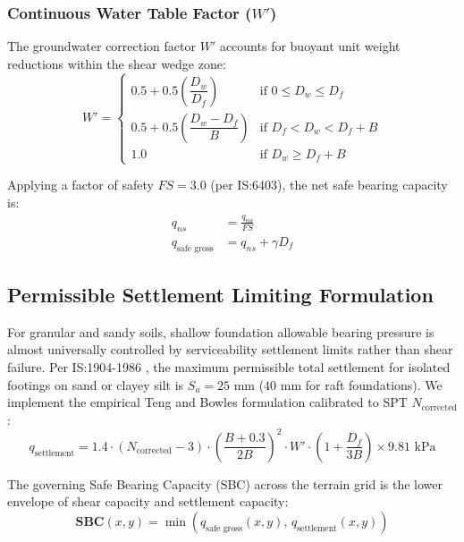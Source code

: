 \documentclass[11pt,a4paper]{article}
\begin{document}
\subsubsection{Continuous Water Table Factor ($W'$)}
The groundwater correction factor $W'$ accounts for buoyant unit weight reductions within the shear wedge zone:
\begin{equation}
W' = \begin{cases}
0.5 + 0.5 \left(\dfrac{D_w}{D_f}\right) & \text{if } 0 \le D_w \le D_f \\[8pt]
0.5 + 0.5 \left(\dfrac{D_w - D_f}{B}\right) & \text{if } D_f < D_w < D_f + B \\[8pt]
1.0 & \text{if } D_w \ge D_f + B
\end{cases}
\end{equation}

Applying a factor of safety $FS = 3.0$ (per IS:6403), the net safe bearing capacity is:
\begin{align}
q_{ns} &= \frac{q_{nu}}{FS} \\
q_{\text{safe gross}} &= q_{ns} + \gamma D_f
\end{align}

\subsection{Permissible Settlement Limiting Formulation}

For granular and sandy soils, shallow foundation allowable bearing pressure is almost universally controlled by serviceability settlement limits rather than shear failure. Per IS:1904-1986 \cite{is1904}, the maximum permissible total settlement for isolated footings on sand or clayey silt is $S_a = 25\text{ mm}$ ($40\text{ mm}$ for raft foundations). We implement the empirical Teng and Bowles formulation calibrated to SPT $N_{\text{corrected}}$ \cite{bowles1996foundation}:
\begin{equation}
q_{\text{settlement}} = 1.4 \cdot \left(N_{\text{corrected}} - 3\right) \cdot \left(\frac{B + 0.3}{2B}\right)^2 \cdot W' \cdot \left(1 + \frac{D_f}{3B}\right) \times 9.81\text{ kPa}
\end{equation}

The governing Safe Bearing Capacity (SBC) across the terrain grid is the lower envelope of shear capacity and settlement capacity:
\begin{equation}
\mathbf{SBC}(x, y) = \min\left(q_{\text{safe gross}}(x, y), \, q_{\text{settlement}}(x, y)\right)
\end{equation}
\end{document}
